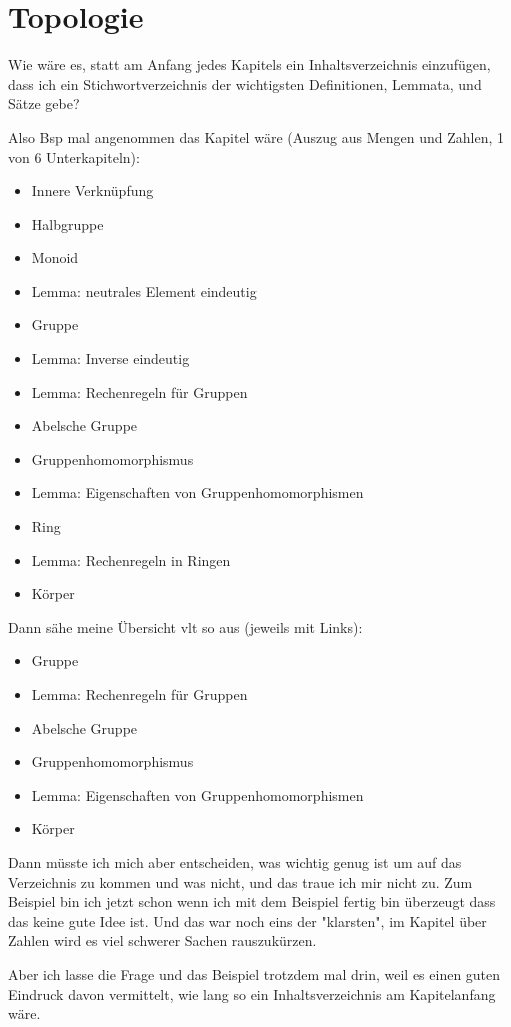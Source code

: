 \chapter{Topologie}

\begin{query}
    Wie wäre es, statt am Anfang jedes Kapitels ein Inhaltsverzeichnis einzufügen, dass ich ein Stichwortverzeichnis der wichtigsten Definitionen, Lemmata, und Sätze gebe?

    Also Bsp mal angenommen das Kapitel wäre (Auszug aus Mengen und Zahlen, 1 von 6 Unterkapiteln):
    \begin{itemize}
        \item Innere Verknüpfung
        \item Halbgruppe
        \item Monoid
        \item Lemma: neutrales Element eindeutig
        \item Gruppe
        \item Lemma: Inverse eindeutig
        \item Lemma: Rechenregeln für Gruppen
        \item Abelsche Gruppe
        \item Gruppenhomomorphismus
        \item Lemma: Eigenschaften von Gruppenhomomorphismen
        \item Ring
        \item Lemma: Rechenregeln in Ringen
        \item Körper
    \end{itemize}
    Dann sähe meine Übersicht vlt so aus (jeweils mit Links):
    \begin{itemize}
        \item Gruppe
        \item Lemma: Rechenregeln für Gruppen
        \item Abelsche Gruppe
        \item Gruppenhomomorphismus
        \item Lemma: Eigenschaften von Gruppenhomomorphismen
        \item Körper
    \end{itemize}

    Dann müsste ich mich aber entscheiden, was wichtig genug ist um auf das Verzeichnis zu kommen und was nicht, und das traue ich mir nicht zu. Zum Beispiel bin ich jetzt schon wenn ich mit dem Beispiel fertig bin überzeugt dass das keine gute Idee ist. Und das war noch eins der "klarsten", im Kapitel über Zahlen wird es viel schwerer Sachen rauszukürzen.

    Aber ich lasse die Frage und das Beispiel trotzdem mal drin, weil es einen guten Eindruck davon vermittelt, wie lang so ein Inhaltsverzeichnis am Kapitelanfang wäre.
\end{query}

